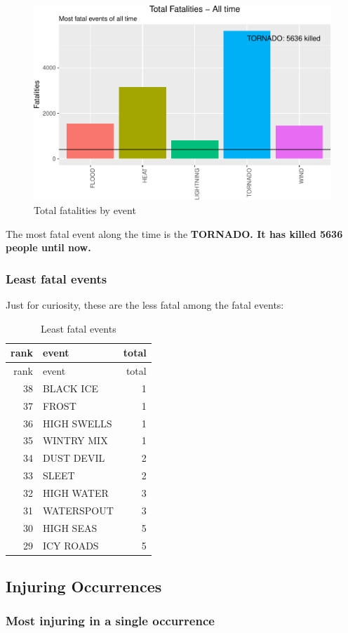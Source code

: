 \documentclass[]{article}
\begin{document}
\begin{figure}[htbp]
\centering
\includegraphics{readme_files/figure-latex/fatal-plot-alltime-1.pdf}
\caption{Total fatalities by event}
\end{figure}

The most fatal event along the time is the \textbf{TORNADO. It has
killed 5636 people until now.}

\subsubsection{Least fatal events}\label{least-fatal-events}

Just for curiosity, these are the less fatal among the fatal events:

\begin{longtable}[]{@{}rlr@{}}
\caption{Least fatal events}\tabularnewline
\toprule
rank & event & total\tabularnewline
\midrule
\endfirsthead
\toprule
rank & event & total\tabularnewline
\midrule
\endhead
38 & BLACK ICE & 1\tabularnewline
37 & FROST & 1\tabularnewline
36 & HIGH SWELLS & 1\tabularnewline
35 & WINTRY MIX & 1\tabularnewline
34 & DUST DEVIL & 2\tabularnewline
33 & SLEET & 2\tabularnewline
32 & HIGH WATER & 3\tabularnewline
31 & WATERSPOUT & 3\tabularnewline
30 & HIGH SEAS & 5\tabularnewline
29 & ICY ROADS & 5\tabularnewline
\bottomrule
\end{longtable}

\subsection{Injuring Occurrences}\label{injuring-occurrences}

\subsubsection{Most injuring in a single
occurrence}\label{most-injuring-in-a-single-occurrence}
\end{document}
